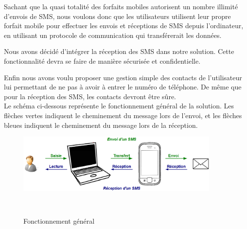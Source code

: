 Sachant que la quasi totalité des forfaits mobiles autorisent un nombre illimité d'envois de SMS, nous voulons donc que les utilisateurs utilisent leur propre forfait mobile pour effectuer les envois et réceptions de SMS depuis l'ordinateur, en utilisant un protocole de communication qui transférerait les données.

Nous avons décidé d'intégrer la réception des SMS dans notre solution.
Cette fonctionnalité devra se faire de manière sécurisée et confidentielle.

Enfin nous avons voulu proposer une gestion simple des contacts de l'utilisateur lui permettant de ne pas à avoir à entrer le numéro de téléphone.
De même que pour la réception des SMS, les contacts devront être sûre.
\\


Le schéma ci-dessous représente le fonctionnement général de la solution.
Les flèches vertes indiquent le cheminement du message lors de l'envoi, et les flèches bleues indiquent le cheminement du message lors de la réception.

\begin{figure}[!h]
	\center
	\includegraphics[width=0.9\textwidth]{img/schemaFonctionnement_general.png}
	\caption{Fonctionnement général}
	\label{schemaFonctionnement_general}
~~\\
\end{figure}
